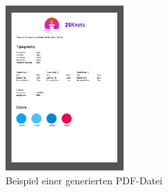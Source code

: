 \begin{figure}[h]
    \centering
    \includegraphics[width=0.4\textwidth]{images/pdf_generated.png}
    \caption{Beispiel einer generierten PDF-Datei}
    \label{fig:pdf}
\end{figure}
